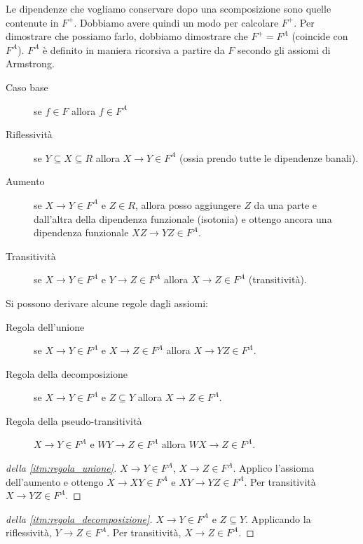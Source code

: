 Le dipendenze che vogliamo conservare dopo una scomposizione sono quelle contenute in $F^{+}$. Dobbiamo avere quindi un modo per calcolare $F^{+}$. Per dimostrare che possiamo farlo, dobbiamo dimostrare che $F^+ = F^A$ (coincide con $F^A$). $F^A$ \`e definito in maniera ricorsiva a partire da $F$ secondo gli assiomi di Armstrong.
\begin{defn}
\begin{description}
    \item[Caso base] se $f \in F$ allora $f \in F^A$
    \item[Riflessivit\`a\label{itm:armstrong_riflessivita}] se $Y \subseteq X \subseteq R$ allora $X \to Y \in F^A$ (ossia prendo tutte le dipendenze banali).
    \item[Aumento\label{itm:armstrong_aumento}] se $X \to Y \in F^A$ e $Z \in R$, allora posso aggiungere $Z$ da una parte e dall'altra della dipendenza funzionale (isotonia) e ottengo ancora una dipendenza funzionale $XZ \to YZ \in F^A$.
    \item[Transitivit\`a\label{itm:armstrong_transitivita}] se $X \to Y \in F^A$ e $Y \to Z \in F^A$ allora $X \to Z \in F^A$ (transitivit\`a).
\end{description}
\end{defn}

Si possono derivare alcune regole dagli assiomi:

\begin{description}
    \item[Regola dell'unione\label{itm:regola_unione}] se $X \to Y \in F^A$ e $X \to Z \in F^A$ allora $X \to YZ \in F^A$.
    \item[Regola della decomposizione\label{itm:regola_decomposizione}] se $X \to Y \in F^A$ e $Z \subseteq Y$ allora $X \to Z \in F^A$.
    \item[Regola della pseudo-transitivit\`a\label{itm:regola_pseudo_transitivita}] $X \to Y \in F^A$ e $WY \to Z \in F^A$ allora $WX \to Z \in F^A$.
\end{description}

\begin{proof}[della \ref{itm:regola_unione}]
$X \to Y \in F^A$, $X \to Z \in F^A$. Applico l'assioma dell'aumento e ottengo $X \to XY \in F^A$ e $XY \to YZ \in F^A$. Per transitivit\`a $X \to YZ \in F^A$.
\end{proof}

\begin{proof}[della \ref{itm:regola_decomposizione}]
$X \to Y \in F^A$ e $Z \subseteq Y$. Applicando la riflessivit\`a, $Y \to Z \in F^A$. Per transitivit\`a, $X \to Z \in F^A$.
\end{proof}

